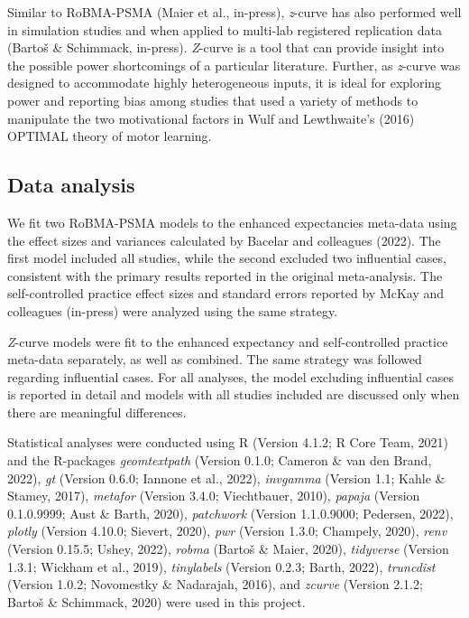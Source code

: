 \documentclass[
  doc, donotrepeattitle,floatsintext]{apa7}
\begin{document}
Similar to RoBMA-PSMA (Maier et al., in-press), \emph{z}-curve has also performed well in simulation studies and when applied to multi-lab registered replication data (Bartoš \& Schimmack, in-press). \emph{Z}-curve is a tool that can provide insight into the possible power shortcomings of a particular literature. Further, as \emph{z}-curve was designed to accommodate highly heterogeneous inputs, it is ideal for exploring power and reporting bias among studies that used a variety of methods to manipulate the two motivational factors in Wulf and Lewthwaite's (2016) OPTIMAL theory of motor learning.

\hypertarget{data-analysis}{%
\subsection{Data analysis}\label{data-analysis}}

We fit two RoBMA-PSMA models to the enhanced expectancies meta-data using the effect sizes and variances calculated by Bacelar and colleagues (2022). The first model included all studies, while the second excluded two influential cases, consistent with the primary results reported in the original meta-analysis. The self-controlled practice effect sizes and standard errors reported by McKay and colleagues (in-press) were analyzed using the same strategy.

\emph{Z}-curve models were fit to the enhanced expectancy and self-controlled practice meta-data separately, as well as combined. The same strategy was followed regarding influential cases. For all analyses, the model excluding influential cases is reported in detail and models with all studies included are discussed only when there are meaningful differences.

Statistical analyses were conducted using R (Version 4.1.2; R Core Team, 2021) and the R-packages \emph{geomtextpath} (Version 0.1.0; Cameron \& van den Brand, 2022), \emph{gt} (Version 0.6.0; Iannone et al., 2022), \emph{invgamma} (Version 1.1; Kahle \& Stamey, 2017), \emph{metafor} (Version 3.4.0; Viechtbauer, 2010), \emph{papaja} (Version 0.1.0.9999; Aust \& Barth, 2020), \emph{patchwork} (Version 1.1.0.9000; Pedersen, 2022), \emph{plotly} (Version 4.10.0; Sievert, 2020), \emph{pwr} (Version 1.3.0; Champely, 2020), \emph{renv} (Version 0.15.5; Ushey, 2022), \emph{robma} (Bartoš \& Maier, 2020), \emph{tidyverse} (Version 1.3.1; Wickham et al., 2019), \emph{tinylabels} (Version 0.2.3; Barth, 2022), \emph{truncdist} (Version 1.0.2; Novomestky \& Nadarajah, 2016), and \emph{zcurve} (Version 2.1.2; Bartoš \& Schimmack, 2020) were used in this project.
\end{document}
